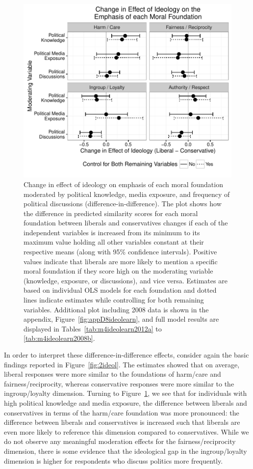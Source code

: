 \documentclass[12pt]{article}
\begin{document}
\begin{figure}[h]\centering
\includegraphics[scale=.9]{../calc/fig/fig4ideolearn.pdf}
\caption{Change in effect of ideology on emphasis of each moral foundation moderated by political knowledge, media exposure, and frequency of political discussions (difference-in-difference). The plot shows how the difference in predicted similarity scores for each moral foundation between liberals and conservatives changes if each of the independent variables is increased from its minimum to its maximum value holding all other variables constant at their respective means (along with 95\% confidence intervals). Positive values indicate that liberals are more likely to mention a specific moral foundation if they score high on the moderating variable (knowledge, exposure, or discussions), and vice versa. Estimates are based on individual OLS models for each foundation and dotted lines indicate estimates while controlling for both remaining variables. Additional plot including 2008 data is shown in the appendix, Figure~\ref{fig:appD8ideolearn}, and full model results are displayed in Tables~\ref{tab:m4ideolearn2012a} to \ref{tab:m4ideolearn2008b}.}\label{fig:4ideolearn}
\end{figure}

In order to interpret these difference-in-difference effects, consider again the basic findings reported in Figure~\ref{fig:2ideol}. The estimates showed that on average, liberal responses were more similar to the foundations of harm/care and fairness/reciprocity, whereas conservative responses were more similar to the ingroup/loyalty dimension. Turning to Figure~\ref{fig:4ideolearn}, we see that for individuals with high political knowledge and media exposure, the difference between liberals and conservatives in terms of the harm/care foundation was more pronounced: the difference between liberals and conservatives is increased such that liberals are even more likely to reference this dimension compared to conservatives. While we do not observe any meaningful moderation effects for the fairness/reciprocity dimension, there is some evidence that the ideological gap in the ingroup/loyalty dimension is higher for respondents who discuss politics more frequently.
\end{document}
